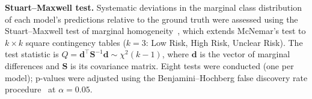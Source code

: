 \documentclass[../main.tex]{subfiles}
\begin{document}
\textbf{Stuart--Maxwell test.}
Systematic deviations in the marginal class distribution of each model's
predictions relative to the ground truth were assessed using the Stuart--Maxwell
test of marginal homogeneity~\citep{Stuart1955,Maxwell1970}, which extends
McNemar's test to $k{\times}k$ square contingency tables
($k = 3$: Low Risk, High Risk, Unclear Risk).
The test statistic is $Q = \mathbf{d}^\top \mathbf{S}^{-1} \mathbf{d}
\sim \chi^2(k{-}1)$, where $\mathbf{d}$ is the vector of marginal differences
and $\mathbf{S}$ is its covariance matrix.
Eight tests were conducted (one per model); p-values were adjusted using the
Benjamini--Hochberg false discovery rate procedure~\citep{Benjamini1995}
at $\alpha = 0.05$.
\end{document}
